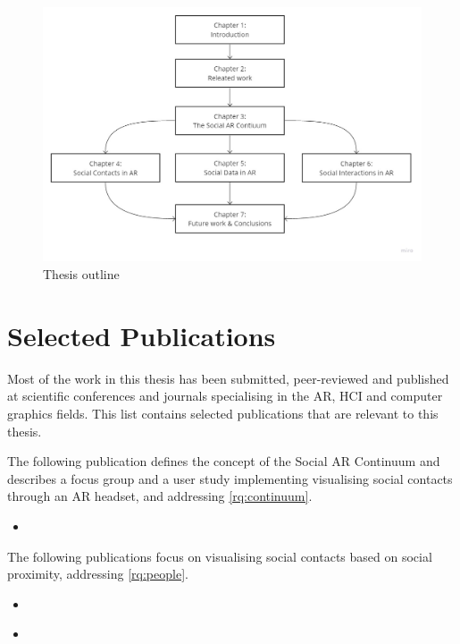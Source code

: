 \begin{figure}
    \centering
    \includegraphics[width=\linewidth]{images/10-intro/thesis-outline.jpg}
    \caption{Thesis outline}
    \label{fig:thesis-outline}
\end{figure}

\section{Selected Publications}
\preto{}

Most of the work in this thesis has been submitted, peer-reviewed and published at scientific conferences and journals specialising in the AR, HCI and computer graphics fields. This list contains selected publications that are relevant to this thesis. 

The following publication defines the concept of the Social AR Continuum and describes a focus group and a user study implementing visualising social contacts through an AR headset, and addressing \ref{rq:continuum}. 

\begin{itemize}
    \item{ }
\end{itemize}

The following publications focus on visualising social contacts based on social proximity, addressing \ref{rq:people}. 

\begin{itemize}
    \item{ }
    \item{ }
\end{itemize}

